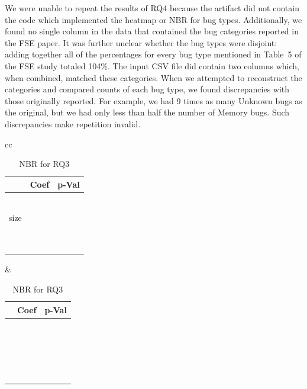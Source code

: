 \documentclass[acmsmall]{acmart}
\begin{document}
We were unable to repeat the results of RQ4 because the artifact did not
contain the code which implemented the heatmap or NBR for bug
types. Additionally, we found no single column in the data that contained
the bug categories reported in the FSE paper. It was further unclear whether
the bug types were disjoint: adding together all of the percentages for
every bug type mentioned in Table~5 of the FSE study totaled 104\%.  The
input CSV file did contain two columns which, when combined, matched these
categories. When we attempted to reconstruct the categories and compared
counts of each bug type, we found discrepancies with those originally
reported.  For example, we had 9 times as many Unknown bugs as the original,
but we had only less than half the number of Memory bugs.  Such discrepancies make
repetition invalid.

\begin{table}[!h]\centering \caption{NBR for RQ3}
\begin{tabular}{cc}
\begin{minipage}{4.5cm}\begin{tabular}{@{}r|rl@{}}  \hline
  \rule{0pt}{3ex} & Coef & p-Val \\ \hline \hline
  \rqIIInameI & \rqIIIcoefI & \rqIIIpvI \\ 
  \rqIIInameII & ~\rqIIIcoefII & \rqIIIpvII \\ 
  \rqIIInameIII size & ~\rqIIIcoefIII & \rqIIIpvIII \\ 
  \rqIIInameIV & ~\rqIIIcoefIV & \rqIIIpvIV \\ 
  \rqIIInameV & ~\rqIIIcoefV & \rqIIIpvV \\  \hline \hline
\end{tabular}
\end{minipage}&\begin{minipage}{4.5cm}
\begin{tabular}{@{}r|rl@{}}  \hline
  \rule{0pt}{3ex} & Coef & p-Val \\ \hline \hline
  \rqIIInameVI & ~\rqIIIcoefVI & \rqIIIpvVI \\ 
  \rqIIInameVII & \rqIIIcoefVII & \rqIIIpvVII \\ 
  \rqIIInameVIII & ~\rqIIIcoefVIII & \rqIIIpvVIII \\ 
  \rqIIInameIX & ~\rqIIIcoefIX & \rqIIIpvIX \\ 
  \rqIIInameX & \rqIIIcoefX & \rqIIIpvX \\ 
  \rqIIInameXI & ~\rqIIIcoefXI & \rqIIIpvXI \\    \hline
\end{tabular}\end{minipage}
\end{tabular}
\label{domainNBR}
\end{table}
\end{document}

